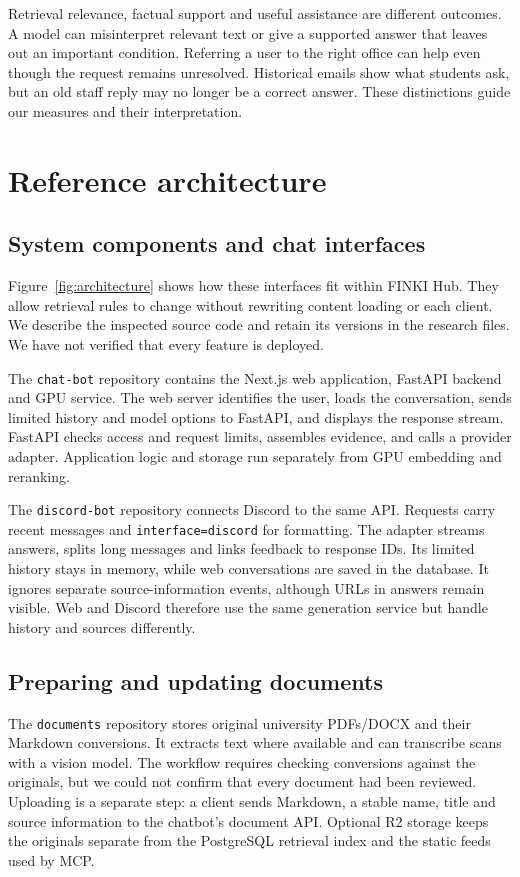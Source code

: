 \documentclass[a4paper,10pt,twocolumn]{article}
\begin{document}
Retrieval relevance, factual support and useful assistance are different outcomes. A model can misinterpret relevant text or give a supported answer that leaves out an important condition. Referring a user to the right office can help even though the request remains unresolved. Historical emails show what students ask, but an old staff reply may no longer be a correct answer. These distinctions guide our measures and their interpretation.

\section{Reference architecture}
\subsection{System components and chat interfaces}
Figure~\ref{fig:architecture} shows how these interfaces fit within FINKI Hub. They allow retrieval rules to change without rewriting content loading or each client. We describe the inspected source code and retain its versions in the research files. We have not verified that every feature is deployed.



The \texttt{chat-bot} repository contains the Next.js web application, FastAPI backend and GPU service. The web server identifies the user, loads the conversation, sends limited history and model options to FastAPI, and displays the response stream. FastAPI checks access and request limits, assembles evidence, and calls a provider adapter. Application logic and storage run separately from GPU embedding and reranking.

The \texttt{discord-bot} repository connects Discord to the same API. Requests carry recent messages and \texttt{interface=discord} for formatting. The adapter streams answers, splits long messages and links feedback to response IDs. Its limited history stays in memory, while web conversations are saved in the database. It ignores separate source-information events, although URLs in answers remain visible. Web and Discord therefore use the same generation service but handle history and sources differently.

\subsection{Preparing and updating documents}
The \texttt{documents} repository stores original university PDFs/DOCX and their Markdown conversions. It extracts text where available and can transcribe scans with a vision model. The workflow requires checking conversions against the originals, but we could not confirm that every document had been reviewed. Uploading is a separate step: a client sends Markdown, a stable name, title and source information to the chatbot's document API. Optional R2 storage keeps the originals separate from the PostgreSQL retrieval index and the static feeds used by MCP.
\end{document}
